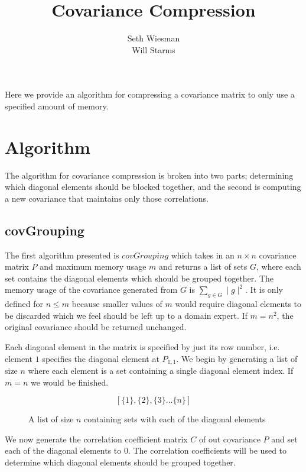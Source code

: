 \documentclass[11pt]{article}
\title{Covariance Compression}
\author{Seth Wiesman\\Will Starms}
\begin{document}
\maketitle

Here we provide an algorithm for compressing a covariance matrix to only use a specified amount of memory. 

\section{Algorithm}
The algorithm for covariance compression is broken into two parts; determining which diagonal elements should be blocked together, and the second is computing a new covariance that maintains only those correlations. 

\subsection{covGrouping}
The first algorithm presented is $covGrouping$ which takes in an $n \times n$ covariance matrix $P$ and maximum memory usage $m$ and returns a list of sets $G$, where each set contains the diagonal elements which should be grouped together. 
The memory usage of the covariance generated from $G$ is $\sum_{g \in G}\mid g \mid^2$.
It is only defined for $n \leq m$ because smaller values of $m$ would require diagonal elements to be discarded which we feel should be left up to a domain expert. 
If $m = n^2$, the original covariance should be returned unchanged. 

Each diagonal element in the matrix is specified by just its row number, i.e. element $1$ specifies the diagonal element at $P_{1,1}$.
We begin by generating a list of size $n$ where each element is a set containing a single diagonal element index. 
If $m = n$ we would be finished. 
\begin{figure}
	$$
		\left[\{1\},\{2\},\{3\}\dots \{n\}\right]
	$$
	\caption{A list of size $n$ containing sets with each of the diagonal elements}
\end{figure}

We now generate the correlation coefficient matrix $C$ of out covariance $P$ and set each of the diagonal elements to $0$.
The correlation coefficients will be used to determine which diagonal elements should be grouped together. 
\end{document}
